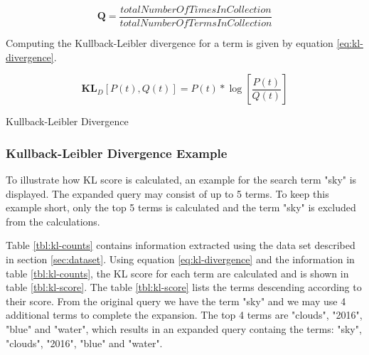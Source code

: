 \begin{cequation}[H]
	\begin{equation}
		\mathbf{Q} = \frac{totalNumberOfTimesInCollection}{totalNumberOfTermsInCollection}
	\end{equation}
	\caption{}
  \label{eq:kl-distribution-q}
\end{cequation}

Computing the Kullback-Leibler divergence for a term is given by equation \ref{eq:kl-divergence}.

\begin{cequation}[H]
	\begin{equation}
		\mathbf{KL}_D[P(t), Q(t)] = P(t)*\log{[\frac{P(t)}{Q(t)}]}
	\end{equation}
	\caption{Kullback-Leibler Divergence}
  \label{eq:kl-divergence}
\end{cequation}

\subsubsection{Kullback-Leibler Divergence Example}
To illustrate how KL score is calculated, an example for the search term "sky" is displayed.
The expanded query may consist of up to 5 terms.
To keep this example short, only the top 5 terms is calculated and the term "sky" is excluded from the calculations.

Table \ref{tbl:kl-counts} contains information extracted using the data set described in section \ref{sec:dataset}.
Using equation \ref{eq:kl-divergence} and the information in table \ref{tbl:kl-counts}, the KL score for each term are calculated and is shown in table \ref{tbl:kl-score}.
The table \ref{tbl:kl-score} lists the terms descending according to their score.
From the original query we have the term "sky" and we may use 4 additional terms to complete the expansion.
The top 4 terms are "clouds", "2016", "blue" and "water",
which results in an expanded query containg the terms: "sky", "clouds", "2016", "blue" and "water".


